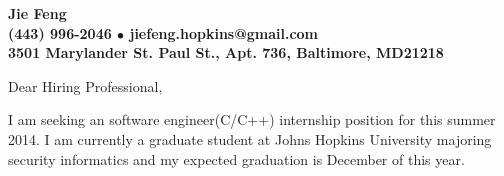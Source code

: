 \documentclass[11pt]{letter} %
\begin{document}

\begin{letter}{
} 


\begin{center}
\large\bf Jie Feng \\ %
 (443) 996-2046 $\bullet$ jiefeng.hopkins@gmail.com \\%
3501 Marylander St. Paul St., Apt. 736, Baltimore, MD21218 
\end{center} 
\vfill
\date{}
\vspace*{-40pt}
\signature{Jie Feng} %


\opening{Dear Hiring Professional,} 

I am seeking an software engineer(C/C++) internship position for this summer 2014.  I am currently a graduate student at Johns Hopkins University majoring security informatics and my expected graduation is December of this year.





\end{letter}
\end{document}
